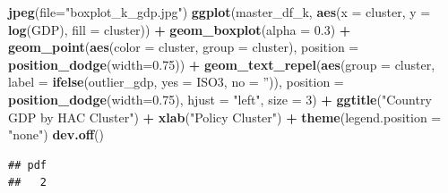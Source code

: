 \documentclass[]{article}
\newenvironment{Shaded}{\begin{snugshade}}{\end{snugshade}}
\newcommand{\DataTypeTok}[1]{\textcolor[rgb]{0.13,0.29,0.53}{#1}}
\newcommand{\DecValTok}[1]{\textcolor[rgb]{0.00,0.00,0.81}{#1}}
\newcommand{\FloatTok}[1]{\textcolor[rgb]{0.00,0.00,0.81}{#1}}
\newcommand{\KeywordTok}[1]{\textcolor[rgb]{0.13,0.29,0.53}{\textbf{#1}}}
\newcommand{\NormalTok}[1]{#1}
\newcommand{\OperatorTok}[1]{\textcolor[rgb]{0.81,0.36,0.00}{\textbf{#1}}}
\newcommand{\StringTok}[1]{\textcolor[rgb]{0.31,0.60,0.02}{#1}}
\begin{document}
\begin{Shaded}
\begin{Highlighting}[]
\KeywordTok{jpeg}\NormalTok{(}\DataTypeTok{file=}\StringTok{"boxplot_k_gdp.jpg"}\NormalTok{)}
\KeywordTok{ggplot}\NormalTok{(master_df_k, }\KeywordTok{aes}\NormalTok{(}\DataTypeTok{x =}\NormalTok{ cluster, }\DataTypeTok{y =} \KeywordTok{log}\NormalTok{(GDP), }\DataTypeTok{fill =} 
\NormalTok{                                                     cluster)) }\OperatorTok{+}
\StringTok{  }\KeywordTok{geom_boxplot}\NormalTok{(}\DataTypeTok{alpha =} \FloatTok{0.3}\NormalTok{) }\OperatorTok{+}
\StringTok{  }\KeywordTok{geom_point}\NormalTok{(}\KeywordTok{aes}\NormalTok{(}\DataTypeTok{color =}\NormalTok{ cluster, }\DataTypeTok{group =}\NormalTok{ cluster), }\DataTypeTok{position =} \KeywordTok{position_dodge}\NormalTok{(}\DataTypeTok{width=}\FloatTok{0.75}\NormalTok{)) }\OperatorTok{+}
\StringTok{  }\KeywordTok{geom_text_repel}\NormalTok{(}\KeywordTok{aes}\NormalTok{(}\DataTypeTok{group =}\NormalTok{ cluster, }
                \DataTypeTok{label =} \KeywordTok{ifelse}\NormalTok{(outlier_gdp, }
                  \DataTypeTok{yes =}\NormalTok{ ISO3,}
                  \DataTypeTok{no =} \StringTok{''}\NormalTok{)), }
            \DataTypeTok{position =} \KeywordTok{position_dodge}\NormalTok{(}\DataTypeTok{width=}\FloatTok{0.75}\NormalTok{),}
            \DataTypeTok{hjust =} \StringTok{"left"}\NormalTok{, }\DataTypeTok{size =} \DecValTok{3}\NormalTok{) }\OperatorTok{+}
\StringTok{  }\KeywordTok{ggtitle}\NormalTok{(}\StringTok{"Country GDP by HAC Cluster"}\NormalTok{) }\OperatorTok{+}\StringTok{ }\KeywordTok{xlab}\NormalTok{(}\StringTok{"Policy Cluster"}\NormalTok{) }\OperatorTok{+}\StringTok{ }\KeywordTok{theme}\NormalTok{(}\DataTypeTok{legend.position =} \StringTok{"none"}\NormalTok{)}
\KeywordTok{dev.off}\NormalTok{()}
\end{Highlighting}
\end{Shaded}

\begin{verbatim}
## pdf 
##   2
\end{verbatim}
\end{document}
